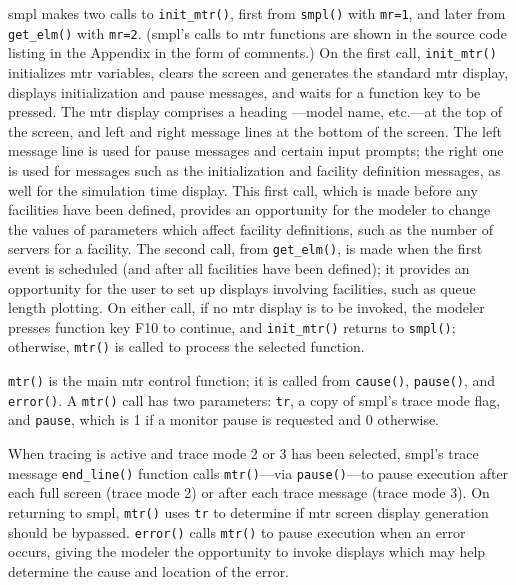 smpl makes two calls to \texttt{init\_mtr()}, first from \texttt{smpl()} with \texttt{mr=1}, and
later from \texttt{get\_elm()} with \texttt{mr=2}. (smpl's calls to mtr functions are shown in
the source code listing in the Appendix in the form of comments.) On the first
call, \texttt{init\_mtr()} initializes mtr variables, clears the screen and generates
the standard mtr display, displays initialization and pause messages, and
waits for a function key to be pressed. The mtr display comprises a heading
---model name, etc.---at the top of the screen, and left and right message
lines at the bottom of the screen. The left message line is used for pause
messages and certain input prompts; the right one is used for messages such
as the initialization and facility definition messages, as well for the
simulation time display. This first call, which is made before any facilities
have been defined, provides an opportunity for the modeler to change the
values of parameters which affect facility definitions, such as the number of
servers for a facility. The second call, from \texttt{get\_elm()}, is made when the
first event is scheduled (and after all facilities have been defined); it
provides an opportunity for the user to set up displays involving facilities,
such as queue length plotting. On either call, if no mtr display is to be
invoked, the modeler presses function key F10 to continue, and \texttt{init\_mtr()}
returns to \texttt{smpl()}; otherwise, \texttt{mtr()} is called to process the selected
function.

\texttt{mtr()} is the main mtr control function; it is called from \texttt{cause()},
\texttt{pause()}, and \texttt{error()}. A \texttt{mtr()} call has two parameters: \texttt{tr}, a copy of
smpl's trace mode flag, and \texttt{pause}, which is 1 if a monitor pause is requested
and 0 otherwise.

When tracing is active and trace mode 2 or 3 has been selected, smpl's
trace message \texttt{end\_line()} function calls \texttt{mtr()}---via \texttt{pause()}---to pause
execution after each full screen (trace mode 2) or after each trace message
(trace mode 3). On returning to smpl, \texttt{mtr()} uses \texttt{tr} to determine if mtr screen
display generation should be bypassed. \texttt{error()} calls \texttt{mtr()} to pause
execution when an error occurs, giving the modeler the opportunity to invoke
displays which may help determine the cause and location of the error.

